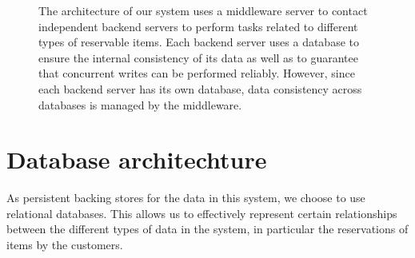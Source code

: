 \documentclass[letterpaper,11pt]{article}
\begin{document}
\begin{figure}[H]
    \centering


    \caption{
        The architecture of our system uses a middleware server to contact
        independent backend servers to perform tasks related to different
        types of reservable items. Each backend server uses a database to
        ensure the internal consistency of its data as well as to guarantee
        that concurrent writes can be performed reliably.
        However, since each backend server has its own database, data
        consistency across databases is managed by the middleware.
    }
\end{figure}

\section*{Database architechture}

As persistent backing stores for the data in this system, we choose to use
relational databases. This allows us to effectively represent certain
relationships between the different types of data in the system, in particular
the reservations of items by the customers.
\end{document}
